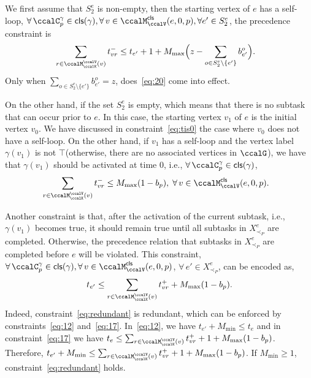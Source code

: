\documentclass[Afour,sageh,times]{sagej}
\newcommand{\clause}[1]{\mathsf{cls}(#1)}
\begin{document}
{{We first assume that $S_2^e$ is non-empty, then  the starting vertex of $e$ has a self-loop, $\forall \, \ccalC_p^{\gamma} \in \clause{\gamma} , \forall \,v \in \ccalM^\mathsf{cls}_\ccalV(e,0,p), \forall e' \in S_2^e$, the precedence constraint is
\begingroup\makeatletter\def\f@size{10}\check@mathfonts
\def\maketag@@@#1{\hbox{\m@th\normalsize\normalfont#1}}%
\begin{align}\label{eq:20}
  & \sum_{r\in \ccalM^\ccalV_{\ccalK}(v)} t_{vr}^-   \leq t_{e'}  + 1 +
  M_{\text{max}} \Big(z  - \sum_{o \in S_2^e\setminus \{e'\}} b_{e'}^o\Big).
\end{align}
\endgroup
Only when $ \sum_{o\in S_2^e\setminus \{e'\}} b_{e'}^o = z $, does~\eqref{eq:20} come into effect.

On the other hand, if the set $S_2^e$ is empty, which means that there is no subtask that can occur prior to $e$. In this case, the starting vertex $v_1$ of $e$ is the initial vertex $v_0$. We have discussed in constraint~\eqref{eq:tis0} the case where $v_0$ does not have a self-loop. On the other hand, if $v_1$ has a self-loop and  the vertex label $\gamma(v_1)$ is not $\top$(otherwise, there are no associated vertices in $\ccalG$), we have that $\gamma(v_1)$ should be activated at time 0, i.e., $\forall\, \ccalC_p^{\gamma} \in \clause{\gamma}$,
\begingroup\makeatletter\def\f@size{10}\check@mathfonts
\def\maketag@@@#1{\hbox{\m@th\normalsize\normalfont#1}}%
\begin{align}\label{eq:zeroactivation}
  & \sum_{r\in \ccalM^\ccalV_{\ccalK}(v)} t_{vr}^-  \leq M_{\text{max}} (1- b_p), \;\forall \,v \in \ccalM^\mathsf{cls}_\ccalV(e,0,p).
\end{align}
\endgroup


Another constraint is that, after the activation of the current subtask, i.e., $\gamma(v_1)$ becomes true, it should remain true until all subtasks in $X^e_{\prec_P}$ are completed. Otherwise, the precedence relation that subtasks in $X^e_{\prec_P}$ are completed before $e$ will be violated. This constraint, $\forall \, \ccalC_p^{\gamma} \in \clause{\gamma} , \forall \,v \in \ccalM^\mathsf{cls}_\ccalV(e,0,p)$,  $\forall\, e' \in X^e_{\prec_P}$,   can be encoded as,
\begingroup\makeatletter\def\f@size{10}\check@mathfonts
\def\maketag@@@#1{\hbox{\m@th\normalsize\normalfont#1}}%
\begin{align}\label{eq:redundant}
   t_{e'}   \leq  \sum_{r\in \ccalM^\ccalV_{\ccalK}(v)} t_{vr}^+   + M_{\text{max}}(1 - b_p).
\end{align}
\endgroup
Indeed, constraint~\eqref{eq:redundant} is redundant, which can be enforced by constraints~\eqref{eq:12} and~\eqref{eq:17}.
In~\eqref{eq:12}, we have $ t_{e'} +  M_{\text{min}}  \leq t_e$ and in constraint~\eqref{eq:17} we have $t_e \leq    \sum_{r\in \ccalM^\ccalV_{\ccalK}(v)} t_{vr}^+ + 1 + M_{\text{max}} (1 - b_{p})$. Therefore, $t_{e'} +  M_{\text{min}} \leq  \sum_{r\in \ccalM^\ccalV_{\ccalK}(v)} t_{vr}^+  + 1 + M_{\text{max}} (1 - b_{p})$. If $M_{\text{min}} \geq 1$, constraint~\eqref{eq:redundant} holds.





}}
\end{document}
